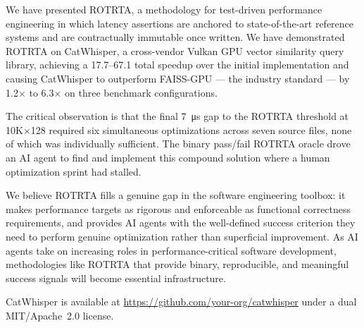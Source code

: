 \documentclass[conference]{IEEEtran}
\begin{document}
We have presented ROTRTA, a methodology for test-driven performance
engineering in which latency assertions are anchored to state-of-the-art
reference systems and are contractually immutable once written.  We have
demonstrated ROTRTA on CatWhisper, a cross-vendor Vulkan GPU vector
similarity query library, achieving a \SI{17.7}{\times}--\SI{67.1}{\times}
total speedup over the initial implementation and causing CatWhisper to
outperform FAISS-GPU --- the industry standard --- by 1.2$\times$ to 6.3$\times$
on three benchmark configurations.

The critical observation is that the final \SI{7}{\micro\second} gap to
the ROTRTA threshold at 10K×128 required six simultaneous optimizations
across seven source files, none of which was individually sufficient.  The
binary pass/fail ROTRTA oracle drove an AI agent to find and implement this
compound solution where a human optimization sprint had stalled.

We believe ROTRTA fills a genuine gap in the software engineering toolbox:
it makes performance targets as rigorous and enforceable as functional
correctness requirements, and provides AI agents with the well-defined
success criterion they need to perform genuine optimization rather than
superficial improvement.  As AI agents take on increasing roles in
performance-critical software development, methodologies like ROTRTA that
provide binary, reproducible, and meaningful success signals will become
essential infrastructure.

CatWhisper is available at \url{https://github.com/your-org/catwhisper}
under a dual MIT/Apache~2.0 license.
\end{document}
